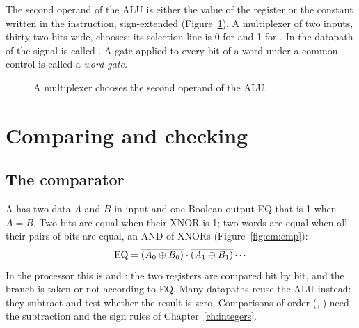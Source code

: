\begin{prgmachine}
The second operand of the ALU is either the value of the register 
or the constant written in the instruction, sign-extended
(Figure~\ref{fig:cm:alusrc}). A multiplexer of two inputs, thirty-two bits
wide, chooses: its selection line is 0 for  and 1 for . In
the datapath of \citet{patterson2020} the signal is called . A
gate applied to every bit of a word under a common control is called a
\emph{word gate}.
\end{prgmachine}

\begin{figure}[htb]
\centering
{}
\caption{A multiplexer chooses the second operand of the ALU.}
\label{fig:cm:alusrc}
\end{figure}

\section{Comparing and checking}

\subsection{The comparator}

A  has two data $A$ and $B$ in input and one Boolean output
EQ that is 1 when $A=B$. Two bits are equal when their XNOR is 1; two words
are equal when all their pairs of bits are equal, an AND of XNORs
(Figure~\ref{fig:cm:cmp}):
\[ \mathrm{EQ}=\overline{(A_0\oplus B_0)}\cdot\overline{(A_1\oplus B_1)}\cdots \]
In the processor this is  and : the two registers are
compared bit by bit, and the branch is taken or not according to EQ. Many
datapaths reuse the ALU instead: they subtract and test whether the result is
zero. Comparisons of order (, ) need the subtraction and
the sign rules of Chapter~\ref{ch:integers}.

